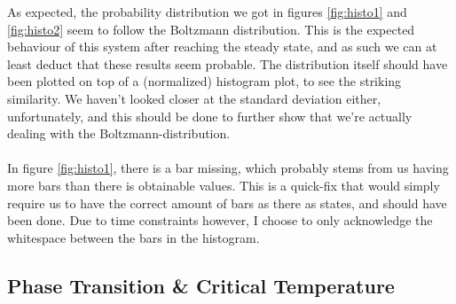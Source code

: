 \documentclass[reprint,english,notitlepage]{revtex4-1}  %
\begin{document}
As expected, the probability distribution we got in figures \ref{fig:histo1} and \ref{fig:histo2} seem to follow the Boltzmann distribution. This is the expected behaviour of this system after reaching the steady state, and as such we can at least deduct that these results seem probable. The distribution itself should have been plotted on top of a (normalized) histogram plot, to see the striking similarity. We haven't looked closer at the standard deviation either, unfortunately, and this should be done to further show that we're actually dealing with the Boltzmann-distribution. 
\\
\\
In figure \ref{fig:histo1}, there is a bar missing, which probably stems from us having more bars than there is obtainable values. This is a quick-fix that would simply require us to have the correct amount of bars as there as states, and should have been done. Due to time constraints however, I choose to only acknowledge the whitespace between the bars in the histogram.

\subsection{Phase Transition \& Critical Temperature}
\end{document}
